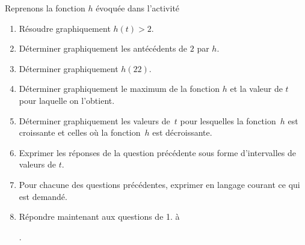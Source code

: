 \exercice Reprenons la fonction $h$ évoquée dans l'activité
\vspace*{-1em}
\begin{center}
\end{center}

\begin{enumerate}
	\item Résoudre graphiquement $h(t) > 2$.
	\item Déterminer graphiquement les antécédents de $2$ par $h$.
	\item Déterminer graphiquement $h(22)$.
	\item Déterminer graphiquement le maximum de la fonction $h$ et la valeur de $t$ pour laquelle on l'obtient.
	\item Déterminer graphiquement les valeurs de~$t$ pour lesquelles la fonction~$h$ est croissante et celles où la fonction~$h$ est décroissante.
	\item Exprimer les réponses de la question précédente sous forme d'intervalles de valeurs de $t$.
	\item Pour chacune des questions précédentes, exprimer en langage courant ce qui est demandé.
	\item Répondre maintenant aux questions de 1. à \addtocounter{enumi}{-2}\theenumi \addtocounter{enumi}{2}.
\end{enumerate}